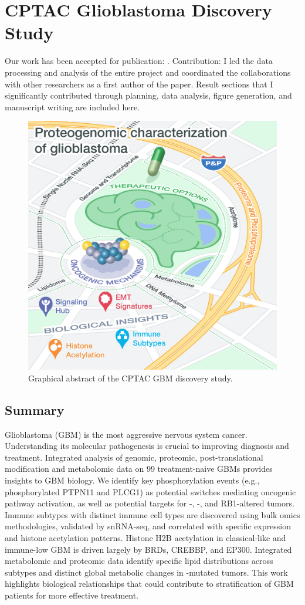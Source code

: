 \chapter{CPTAC Glioblastoma Discovery Study}
\label{chap:cptac-gbm-discov}

Our work has been accepted for publication: . Contribution: I led the data processing and analysis of the entire project and coordinated the collaborations with other researchers as a first author of the paper. Result sections that I significantly contributed through planning, data analysis, figure generation, and manuscript writing are included here.


\begin{figure}[tbp]
    \centering
    \includegraphics[width=0.5\linewidth]{figures/chap04_cptac_gbm_discov/graphical_abstract.png}
    \caption{Graphical abstract of the CPTAC GBM discovery study.}
    \label{fig:gbm-graphical-abstract}
\end{figure}


\section{Summary}
Glioblastoma (GBM) is the most aggressive nervous system cancer. Understanding its molecular pathogenesis is crucial to improving diagnosis and treatment. Integrated analysis of genomic, proteomic, post-translational modification and metabolomic data on 99 treatment-naive GBMs provides insights to GBM biology. We identify key phosphorylation events (e.g., phosphorylated PTPN11 and PLCG1) as potential switches mediating oncogenic pathway activation, as well as potential targets for -, -, and RB1-altered tumors. Immune subtypes with distinct immune cell types are discovered using bulk omics methodologies, validated by snRNA-seq, and correlated with specific expression and histone acetylation patterns. Histone H2B acetylation in classical-like and immune-low GBM is driven largely by BRDs, CREBBP, and EP300. Integrated metabolomic and proteomic data identify specific lipid distributions across subtypes and distinct global metabolic changes in -mutated tumors. This work highlights biological relationships that could contribute to stratification of GBM patients for more effective treatment.


